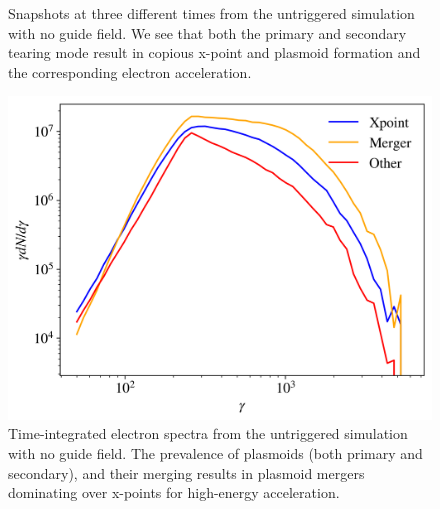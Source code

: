 \documentclass[iop,twocolappendix]{emulateapj}
\begin{document}
\begin{figure}[!h]
	\caption{Snapshots at three different times from the untriggered simulation with no guide field.  We see that both the primary and secondary tearing mode result in copious x-point and plasmoid formation and the corresponding electron acceleration.  
	}
	\label{untriggered_bguide0_snapshots}
\end{figure}

\begin{figure}[htp]
	
	\includegraphics[width=\linewidth]{8k_bguide0_untriggered_accmec_spect.png}
	\caption{Time-integrated electron spectra from the untriggered simulation with no guide field.  The prevalence of plasmoids (both primary and secondary), and their merging results in plasmoid mergers dominating over x-points for high-energy acceleration.}
	\label{untriggered_bguide0_spec}
\end{figure}


\end{document}
